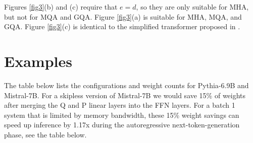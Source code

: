 \documentclass{article}
\begin{document}
Figures \ref{fig3}(b) and (c) require that $e = d$, so they are only suitable for MHA, but not for MQA and GQA. Figure \ref{fig3}(a) is suitable for MHA, MQA, and GQA. Figure \ref{fig3}(c) is identical to the simplified transformer proposed in \cite{simplified}.

\section{Examples}
The table below lists the configurations and weight counts for Pythia-6.9B and Mistral-7B. For a skipless version of Mistral-7B we would save 15\% of weights after merging the Q and P linear layers into the FFN layers. For a batch 1 system that is limited by memory bandwidth, these 15\% weight savings can speed up inference by 1.17x during the autoregressive next-token-generation phase, see the table below.
\end{document}
